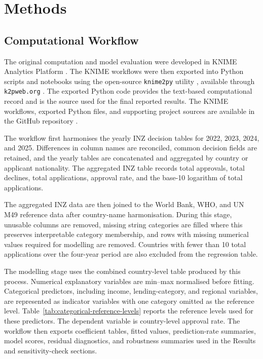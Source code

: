 \documentclass[runningheads]{llncs}
\begin{document}
\section{Methods}

\subsection{Computational Workflow}

The original computation and model evaluation were developed in KNIME Analytics Platform \cite{KNIMEPlatform}. The KNIME workflows were then exported into Python scripts and notebooks using the open-source \texttt{knime2py} utility \cite{Knime2py}, available through \texttt{k2pweb.org} \cite{K2PWeb}. The exported Python code provides the text-based computational record and is the source used for the final reported results. The KNIME workflows, exported Python files, and supporting project sources are available in the GitHub repository \cite{KaplanINZRepo}.

The workflow first harmonises the yearly INZ decision tables for 2022, 2023, 2024, and 2025. Differences in column names are reconciled, common decision fields are retained, and the yearly tables are concatenated and aggregated by country or applicant nationality. The aggregated INZ table records total approvals, total declines, total applications, approval rate, and the base-10 logarithm of total applications.

The aggregated INZ data are then joined to the World Bank, WHO, and UN M49 reference data after country-name harmonisation. During this stage, unusable columns are removed, missing string categories are filled where this preserves interpretable category membership, and rows with missing numerical values required for modelling are removed. Countries with fewer than 10 total applications over the four-year period are also excluded from the regression table.

The modelling stage uses the combined country-level table produced by this process. Numerical explanatory variables are min--max normalised before fitting. Categorical predictors, including income, lending-category, and regional variables, are represented as indicator variables with one category omitted as the reference level. Table~\ref{tab:categorical-reference-levels} reports the reference levels used for these predictors. The dependent variable is country-level approval rate. The workflow then exports coefficient tables, fitted values, prediction-rate summaries, model scores, residual diagnostics, and robustness summaries used in the Results and sensitivity-check sections.
\end{document}
